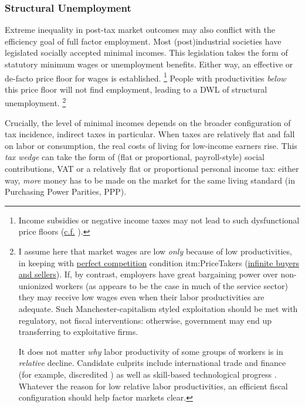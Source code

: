 \subsubsection{Structural Unemployment}
	\label{sec:StructuralUnemployment}
Extreme inequality in post-tax market outcomes may also conflict with the efficiency goal of full factor employment.
Most (post)industrial societies have legislated socially accepted minimal incomes.
This legislation takes the form of statutory minimum wages or unemployment benefits.
Either way, an effective or de-facto price floor for wages is established.
\footnote{
	Income subsidies or negative income taxes may not lead to such dysfunctional price floors (\hyperref[http://maxheld.de/2010/04/19/sharing-the-burden/]{c.f.} \citealt{Held2010}).
}
People with productivities \emph{below} this price floor will not find employment, leading to a DWL of structural unemployment.
\footnote{
	I assume here that market wages are low \emph{only} because of low productivities, in keeping with \hyperref[sec:PerfectCompetition]{perfect competition} condition {itm:PriceTakers} (\hyperref[itm:PriceTakers]{infinite buyers and sellers}).
	If, by contrast, employers have great bargaining power over non-unionized workers (as appears to be the case in much of the service sector) they may receive low wages even when their labor productivities are adequate.
	Such Manchester-capitalism styled exploitation should be met with regulatory, not fiscal interventions:
	otherwise, government may end up transferring to exploitative firms.

	It does not matter \emph{why} labor productivity of some groups of workers is in \emph{relative} decline.
	Candidate culprits include international trade and finance (for example, discredited \citealt{Stolper1941}) as well as skill-based technological progress \citep{Card2001}.
	Whatever the reason for low relative labor productivities, an efficient fiscal configuration should help factor markets clear.
}

Crucially, the level of minimal incomes depends on the broader configuration of tax incidence, indirect taxes in particular.
When taxes are relatively flat and fall on labor or consumption, the real costs of living for low-income earners rise.
This \emph{tax wedge} can take the form of (flat or proportional, payroll-style) social contributions, VAT or a relatively flat or proportional personal income tax:
either way, \emph{more} money has to be made on the market for the same living standard (in Purchasing Power Parities, PPP).

